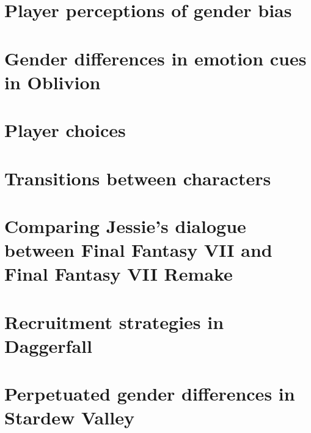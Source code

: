 \documentclass[12pt,a4paper]{article}
\newcommand{\includepdfPlus}[1]{}
\begin{document}
\includepdfPlus{../../analysis/Analyse_MajorVsMinorCharacters.pdf}

\clearpage
\newpage
\section{Player perceptions of gender bias}

\includepdfPlus{../../analysis/survey/analyseSurvey.pdf}

\clearpage
\newpage
\section{Gender differences in emotion cues in Oblivion}

\includepdfPlus{../../analysis/Appendices/Analyse_Oblivion_Emotions.pdf}


\clearpage
\newpage
\section{Player choices}

\includepdfPlus{../../analysis/Analyse_PlayerChoices.pdf}

\clearpage
\newpage
\section{Transitions between characters}

\includepdfPlus{../../analysis/Analyse_Transitions.pdf}

\clearpage
\newpage
\section{Comparing Jessie's dialogue between Final Fantasy VII and Final Fantasy VII Remake}

\includepdfPlus{../../analysis/Appendices/JesseStudyEdited.pdf}


\clearpage
\newpage
\section{Recruitment strategies in Daggerfall}
\includepdfPlus{../../analysis/Appendices/Analyse_Daggerfall.pdf}


\clearpage
\newpage
\section{Perpetuated gender differences in Stardew Valley}
\includepdfPlus{../../analysis/Appendices/Analyse_StardewValley.pdf}
\end{document}
